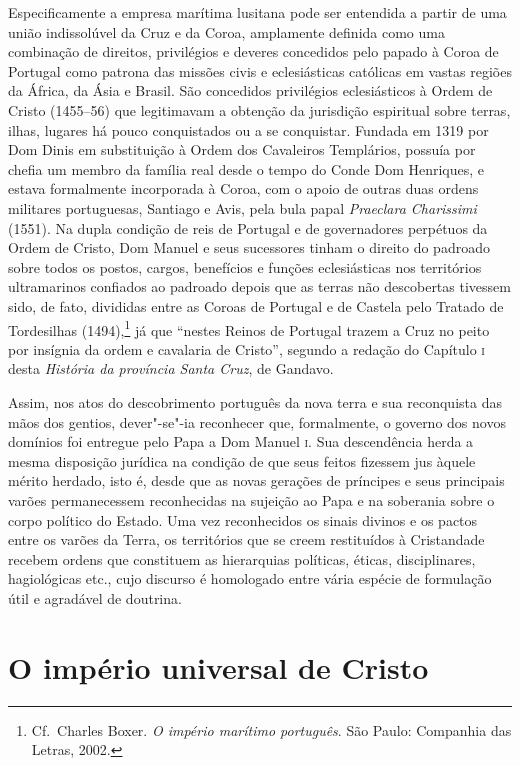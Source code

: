 Especificamente a empresa marítima lusitana pode ser entendida a partir
de uma união indissolúvel da Cruz e da Coroa, amplamente definida como
uma combinação de direitos, privilégios e deveres concedidos pelo
papado à Coroa de Portugal como patrona das missões civis e
eclesiásticas católicas em vastas regiões da África, da Ásia e Brasil.
São concedidos privilégios eclesiásticos à Ordem de Cristo (1455--56)
que legitimavam a obtenção da jurisdição espiritual sobre terras,
ilhas, lugares há pouco conquistados ou a se conquistar. Fundada em
1319 por Dom Dinis em substituição à Ordem dos Cavaleiros Templários,
possuía por chefia um membro da família real desde o tempo do Conde Dom
Henriques, e estava formalmente incorporada à Coroa, com o apoio de
outras duas ordens militares portuguesas, Santiago e Avis, pela bula
papal \textit{Praeclara Charissimi} (1551). Na dupla condição de reis de
Portugal e de governadores perpétuos da Ordem de Cristo, Dom Manuel e
seus sucessores tinham o direito do padroado sobre todos os postos,
cargos, benefícios e funções eclesiásticas nos territórios ultramarinos
confiados ao padroado depois que as terras não descobertas tivessem
sido, de fato, divididas entre as Coroas de Portugal e de Castela pelo
Tratado de Tordesilhas (1494),\footnote{ Cf.~Charles Boxer. \textit{O império
marítimo português}. São Paulo: Companhia das Letras, 2002.} já que
``nestes Reinos de Portugal trazem a Cruz no peito por
insígnia da ordem e cavalaria de Cristo'', segundo a
redação do Capítulo \textsc{i} desta \textit{História da província Santa Cruz}, de Gandavo.

Assim, nos atos do descobrimento português da nova terra e sua
reconquista das mãos dos gentios, dever"-se"-ia reconhecer que,
formalmente, o governo dos novos domínios foi entregue pelo Papa a Dom
Manuel \textsc{i}. Sua descendência herda a mesma disposição jurídica na
condição de que seus feitos fizessem jus àquele mérito herdado, isto é,
desde que as novas gerações de príncipes e seus principais varões
permanecessem reconhecidas na sujeição ao Papa e na soberania sobre o
corpo político do Estado. Uma vez reconhecidos os sinais divinos e os
pactos entre os varões da Terra, os territórios que se creem
restituídos à Cristandade recebem ordens que constituem as hierarquias
políticas, éticas, disciplinares, hagiológicas etc., cujo discurso é
homologado entre vária espécie de formulação útil e agradável de doutrina. 

\section*{O império universal de Cristo}

